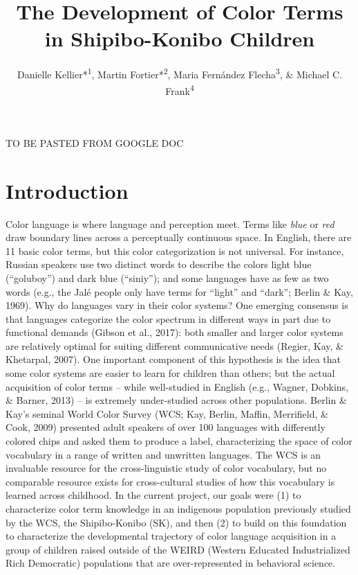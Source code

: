 \documentclass[
  english,
  ,man,floatsintext]{apa6}
\title{The Development of Color Terms in Shipibo-Konibo Children}
\author{Danielle Kellier*\textsuperscript{1}, Martin Fortier*\textsuperscript{2}, Maria Fernández Flecha\textsuperscript{3}, \& Michael C. Frank\textsuperscript{4}}
\date{}
\affiliation{\vspace{0.5cm}\textsuperscript{1} University of Pennsylvania\\\textsuperscript{2} PSL Research University\\\textsuperscript{3} Pontificia Universidad Católica del Perú\\\textsuperscript{4} Stanford University}
\begin{document}
\maketitle

TO BE PASTED FROM GOOGLE DOC

\hypertarget{introduction}{%
\section{Introduction}\label{introduction}}

Color language is where language and perception meet. Terms like \emph{blue} or \emph{red} draw boundary lines across a perceptually continuous space. In English, there are 11 basic color terms, but this color categorization is not universal. For instance, Russian speakers use two distinct words to describe the colors light blue (\enquote{goluboy}) and dark blue (\enquote{siniy}); and some languages have as few as two words (e.g., the Jalé people only have terms for ``light'' and ``dark''; Berlin \& Kay, 1969). Why do languages vary in their color systems? One emerging consensus is that languages categorize the color spectrum in different ways in part due to functional demands (Gibson et al., 2017): both smaller and larger color systems are relatively optimal for suiting different communicative needs (Regier, Kay, \& Khetarpal, 2007).
One important component of this hypothesis is the idea that some color systems are easier to learn for children than others; but the actual acquisition of color terms -- while well-studied in English (e.g., Wagner, Dobkins, \& Barner, 2013) -- is extremely under-studied across other populations. Berlin \& Kay's seminal World Color Survey (WCS; Kay, Berlin, Maffin, Merrifield, \& Cook, 2009) presented adult speakers of over 100 languages with differently colored chips and asked them to produce a label, characterizing the space of color vocabulary in a range of written and unwritten languages. The WCS is an invaluable resource for the cross-linguistic study of color vocabulary, but no comparable resource exists for cross-cultural studies of how this vocabulary is learned across childhood.
In the current project, our goals were (1) to characterize color term knowledge in an indigenous population previously studied by the WCS, the Shipibo-Konibo (SK), and then (2) to build on this foundation to characterize the developmental trajectory of color language acquisition in a group of children raised outside of the WEIRD (Western Educated Industrialized Rich Democratic) populations that are over-represented in behavioral science.
\end{document}
